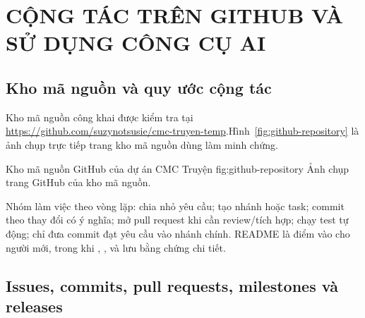 \chapter{CỘNG TÁC TRÊN GITHUB VÀ SỬ DỤNG CÔNG CỤ AI}

\section{Kho mã nguồn và quy ước cộng tác}

Kho mã nguồn công khai được kiểm tra tại \url{https://github.com/suzynotsusie/cmc-truyen-temp}.Hình~\ref{fig:github-repository} là ảnh chụp trực tiếp trang kho mã nguồn dùng làm minh chứng.

  {Kho mã nguồn GitHub của dự án CMC Truyện}
  {fig:github-repository}
  {Ảnh chụp trang GitHub của kho mã nguồn.}

Nhóm làm việc theo vòng lặp: chia nhỏ yêu cầu; tạo nhánh hoặc task; commit theo thay đổi có ý nghĩa; mở pull request khi cần review/tích hợp; chạy test tự động; chỉ đưa commit đạt yêu cầu vào nhánh chính. README là điểm vào cho người mới, trong khi , ,  và  lưu bằng chứng chi tiết.

\section{Issues, commits, pull requests, milestones và releases}


